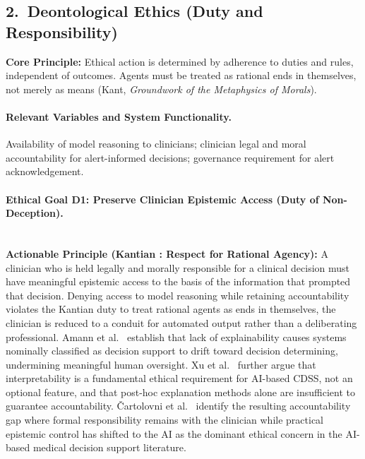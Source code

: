 \documentclass[]{UCD_CS_41820_Report}
\begin{document}
\subsection*{2.\ Deontological Ethics (Duty and Responsibility)}

\textbf{Core Principle:} Ethical action is determined by adherence to duties and
rules, independent of outcomes. Agents must be treated as rational ends in
themselves, not merely as means (Kant, \textit{Groundwork of the Metaphysics of
Morals}).

\paragraph{Relevant Variables and System Functionality.}
Availability of model reasoning to clinicians; clinician legal and moral
accountability for alert-informed decisions; governance requirement for alert
acknowledgement.

\paragraph{Ethical Goal D1: Preserve Clinician Epistemic Access (Duty of Non-Deception).}~\\

\textbf{Actionable Principle (Kantian : Respect for Rational Agency):}
A clinician who is held legally and morally responsible for a clinical decision must
have meaningful epistemic access to the basis of the information that prompted that
decision. Denying access to model reasoning while retaining accountability violates
the Kantian duty to treat rational agents as ends in themselves,  the clinician is
reduced to a conduit for automated output rather than a deliberating professional.
Amann et al.\ \cite{amann2022} establish that lack of explainability causes systems
nominally classified as decision support to drift toward decision determining,
undermining meaningful human oversight. Xu et al.\ \cite{xu2023} further argue that
interpretability is a fundamental ethical requirement for AI-based CDSS, not an
optional feature, and that post-hoc explanation methods alone are insufficient to
guarantee accountability. \v{C}artolovni et al.\ \cite{cartoloni2022} identify the
resulting accountability gap where formal responsibility remains with the clinician
while practical epistemic control has shifted to the AI as the dominant ethical
concern in the AI-based medical decision support literature.\par
\end{document}

